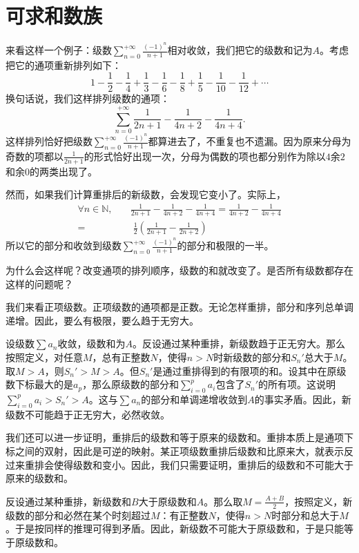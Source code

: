 \documentclass[12pt,UTF8,fontset=none]{ctexbook}
\begin{document}
\section{可求和数族}

来看这样一个例子：级数$\sum_{n=0}^{+\infty} \frac{(-1)^{n}}{n+1}$相对收敛，我们把它的级数和记为$A$。考虑把它的通项重新排列如下：
$$ 1 - \frac{1}{2} - \frac{1}{4} + \frac{1}{3} - \frac{1}{6} - \frac{1}{8} + \frac{1}{5} - \frac{1}{10} - \frac{1}{12} + \cdots $$
换句话说，我们这样排列级数的通项：
$$ \sum_{n=0}^{+\infty} \frac{1}{2n + 1} - \frac{1}{4n + 2} - \frac{1}{4n + 4}.$$
这样排列恰好把级数$\sum_{n=0}^{+\infty} \frac{(-1)^{n}}{n+1}$都算进去了，不重复也不遗漏。因为原来分母为奇数的项都以$\frac{1}{2n + 1}$的形式恰好出现一次，分母为偶数的项也都分别作为除以$4$余$2$和余$0$的两类出现了。

然而，如果我们计算重排后的新级数，会发现它变小了。实际上，
\begin{align*}
    \forall n \in \mathbb{N}, \quad &\frac{1}{2n + 1} - \frac{1}{4n + 2} - \frac{1}{4n + 4} = \frac{1}{4n + 2} - \frac{1}{4n + 4} \\
    =&\; \frac{1}{2} \left( \frac{1}{2n + 1} - \frac{1}{2n + 2}\right)
\end{align*}
所以它的部分和收敛到级数$\sum_{n=0}^{+\infty} \frac{(-1)^{n}}{n+1}$的部分和极限的一半。

为什么会这样呢？改变通项的排列顺序，级数的和就改变了。是否所有级数都存在这样的问题呢？

我们来看正项级数。正项级数的通项都是正数。无论怎样重排，部分和序列总单调递增。因此，要么有极限，要么趋于无穷大。

设级数$\sum a_n$收敛，级数和为$A$。反设通过某种重排，新级数趋于正无穷大。那么按照定义，对任意$M$，总有正整数$N$，使得$n>N$时新级数的部分和$S_n'$总大于$M$。取$M>A$，则$S_n'>M>A$。但$S_n'$是通过重排得到的有限项的和。设其中在原级数下标最大的是$a_p$，那么原级数的部分和$\sum_{i=0}^p a_i$包含了$S_n'$的所有项。这说明$\sum_{i=0}^p a_i>S_n'>A$。这与$\sum a_n$的部分和单调递增收敛到$A$的事实矛盾。因此，新级数不可能趋于正无穷大，必然收敛。

我们还可以进一步证明，重排后的级数和等于原来的级数和。重排本质上是通项下标之间的双射，因此是可逆的映射。某正项级数重排后级数和比原来大，就表示反过来重排会使得级数和变小。因此，我们只需要证明，重排后的级数和不可能大于原来的级数和。

反设通过某种重排，新级数和$B$大于原级数和$A$。那么取$M = \frac{A+B}{2}$，按照定义，新级数的部分和必然在某个时刻超过$M$：有正整数$N$，使得$n>N$时部分和总大于$M$。于是按同样的推理可得到矛盾。因此，新级数不可能大于原级数和，于是只能等于原级数和。
\end{document}
